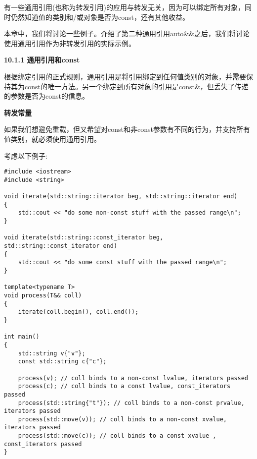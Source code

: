 有一些通用引用(也称为转发引用)的应用与转发无关，因为可以绑定所有对象，同时仍然知道值的类别和/或对象是否为const，还有其他收益。\par

本章中，我们将讨论一些例子。介绍了第二种通用引用auto\&\&之后，我们将讨论使用通用引用作为非转发引用的实际示例。\par

\hspace*{\fill} \par %
\textbf{10.1.1 通用引用和const}

根据绑定引用的正式规则，通用引用是将引用绑定到任何值类别的对象，并需要保持其为const的唯一方法。另一个绑定到所有对象的引用是const\&，但丢失了传递的参数是否为const的信息。\par

\hspace*{\fill} \par %
\textbf{转发常量}

如果我们想避免重载，但又希望对const和非const参数有不同的行为，并支持所有值类别，就必须使用通用引用。\par

考虑以下例子:\par

{\color{red}{generic/universalconst.cpp}}\par

\begin{lstlisting}[caption={}]
#include <iostream>
#include <string>

void iterate(std::string::iterator beg, std::string::iterator end)
{
	std::cout << "do some non-const stuff with the passed range\n";
}

void iterate(std::string::const_iterator beg, std::string::const_iterator end)
{
	std::cout << "do some const stuff with the passed range\n";
}

template<typename T>
void process(T&& coll)
{
	iterate(coll.begin(), coll.end());
}

int main()
{
	std::string v{"v"};
	const std::string c{"c"};
	
	process(v); // coll binds to a non-const lvalue, iterators passed
	process(c); // coll binds to a const lvalue, const_iterators passed
	process(std::string{"t"}); // coll binds to a non-const prvalue, iterators passed
	process(std::move(v)); // coll binds to a non-const xvalue, iterators passed
	process(std::move(c)); // coll binds to a const xvalue , const_iterators passed
}
\end{lstlisting}

